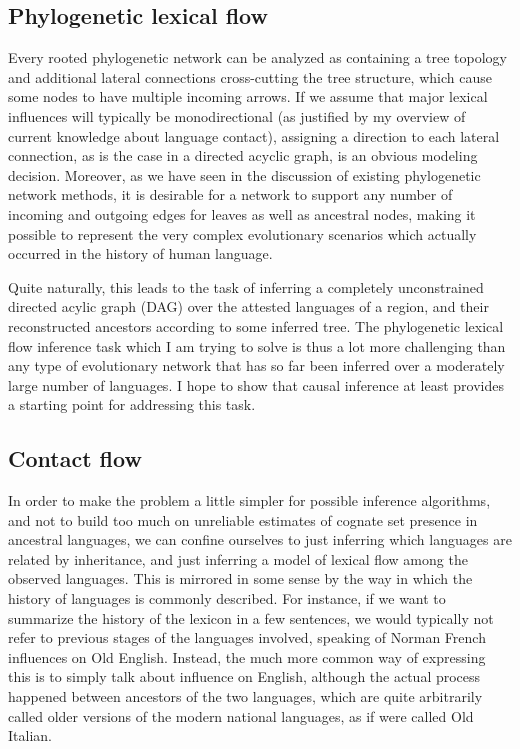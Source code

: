 \subsection{Phylogenetic lexical flow}
Every rooted phylogenetic network can be analyzed as containing a tree topology and additional lateral connections cross-cutting the tree structure, which cause some nodes to have multiple incoming arrows. If we assume that major lexical influences will typically be monodirectional (as justified by my overview of current knowledge about language contact), assigning a direction to each lateral connection, as is the case in a directed acyclic graph, is an obvious modeling decision. Moreover, as we have seen in the discussion of existing phylogenetic network methods, it is desirable for a network to support any number of incoming and outgoing edges for leaves as well as ancestral nodes, making it possible to represent the very complex evolutionary scenarios which actually occurred in the history of human language.

Quite naturally, this leads to the task of inferring a completely unconstrained directed acylic graph (DAG) over the attested languages of a region, and their reconstructed ancestors according to some inferred tree. The phylogenetic lexical flow inference task which I am trying to solve is thus a lot more challenging than any type of evolutionary network that has so far been inferred over a moderately large number of languages. I hope to show that causal inference at least provides a starting point for addressing this task.

\subsection{Contact flow}
In order to make the problem a little simpler for possible inference algorithms, and not to build too much on unreliable estimates of cognate set presence in ancestral languages, we can confine ourselves to just inferring which languages are related by inheritance, and just inferring a model of lexical flow among the observed languages. This is mirrored in some sense by the way in which the history of languages is commonly described. For instance, if we want to summarize the history of the  lexicon in a few sentences, we would typically not refer to previous stages of the languages involved, speaking of Norman French influences on Old English. Instead, the much more common way of expressing this is to simply talk about  influence on English, although the actual process happened between ancestors of the two languages, which are quite arbitrarily called older versions of the modern national languages, as if  were called Old Italian.

